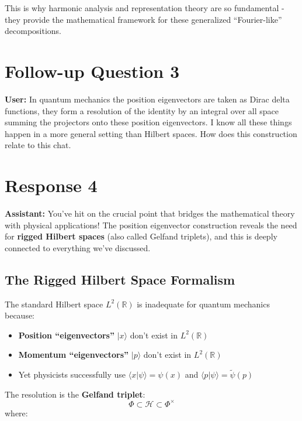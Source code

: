 \documentclass[aps,prl,reprint]{revtex4-2}
\begin{document}
This is why harmonic analysis and representation theory are so fundamental -
they provide the mathematical framework for these generalized
``Fourier-like'' decompositions.

\section*{Follow-up Question 3}

\textbf{User:} In quantum mechanics the position eigenvectors are taken as
Dirac delta functions, they form a resolution of the identity by an integral
over all space summing the projectors onto these position eigenvectors. I
know all these things happen in a more general setting than Hilbert spaces.
How does this construction relate to this chat.

\section*{Response 4}

\textbf{Assistant:} You've hit on the crucial point that bridges the
mathematical theory with physical applications! The position eigenvector
construction reveals the need for \textbf{rigged Hilbert spaces} (also
called Gelfand triplets), and this is deeply connected to everything we've
discussed.

\subsection*{The Rigged Hilbert Space Formalism}

The standard Hilbert space $L^2(\mathbb{R})$ is inadequate for quantum
mechanics because:

\begin{itemize}
\item \textbf{Position ``eigenvectors''} $|x\rangle$ don't exist in $L^2(%
\mathbb{R})$

\item \textbf{Momentum ``eigenvectors''} $|p\rangle$ don't exist in $L^2(%
\mathbb{R})$

\item Yet physicists successfully use $\langle x|\psi\rangle = \psi(x)$ and $%
\langle p|\psi\rangle = \tilde{\psi}(p)$
\end{itemize}

The resolution is the \textbf{Gelfand triplet}: 
\begin{equation*}
\Phi \subset \mathcal{H} \subset \Phi^\times 
\end{equation*}
where:
\end{document}
